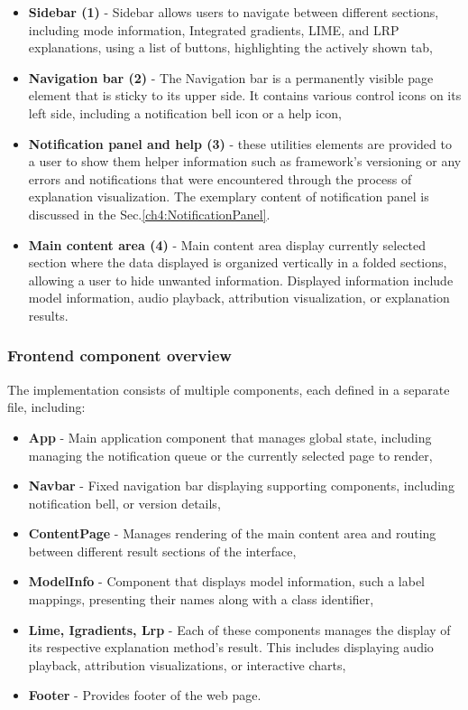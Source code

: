\documentclass[
    bindingoffset=5mm,  %
    footnoteindent=3mm, %
    hyphenation=true    %
]{src/wut-thesis}
\begin{document}
\begin{itemize}
    \item \textbf{Sidebar (1)} - Sidebar allows users to navigate between different sections, including mode
        information, Integrated gradients, LIME, and LRP explanations, using a list of buttons, highlighting
        the actively shown tab,
    \item \textbf{Navigation bar (2)} - The Navigation bar is a permanently visible page element that is sticky
        to its upper side. It contains various control icons on its left side, including a notification
        bell icon or a help icon,
    \item \textbf{Notification panel and help (3)} - these utilities elements are provided
        to a user to show them helper information such as framework's versioning or any errors
        and notifications that were encountered through the process of explanation visualization.
        The exemplary content of notification panel is discussed in the Sec.\ref{ch4:NotificationPanel}. 
    \item \textbf{Main content area (4)} - Main content area display currently selected section
        where the data displayed is organized vertically in a folded sections, allowing a user
        to hide unwanted information. Displayed information include model information, audio playback,
        attribution visualization, or explanation results.
\end{itemize}

\subsubsection{Frontend component overview}

The implementation consists of multiple components,
each defined in a separate file, including:

\begin{itemize}[itemsep=1\baselineskip]
	\item \textbf{App} - Main application component that manages global state,
        including managing the notification queue or the currently selected page to render,
    \item \textbf{Navbar} - Fixed navigation bar displaying supporting components,
        including notification bell, or version details,
    \item \textbf{ContentPage} - Manages rendering of the main content area and
        routing between different result sections of the interface,
    \item \textbf{ModelInfo} - Component that displays model information,
        such a label mappings, presenting their names along with a class identifier,
    \item \textbf{Lime, Igradients, Lrp} - Each of these components manages the display of its
        respective explanation method’s result. This includes displaying audio playback,
        attribution visualizations, or interactive charts,
    \item \textbf{Footer} - Provides footer of the web page.
\end{itemize}
\end{document}
